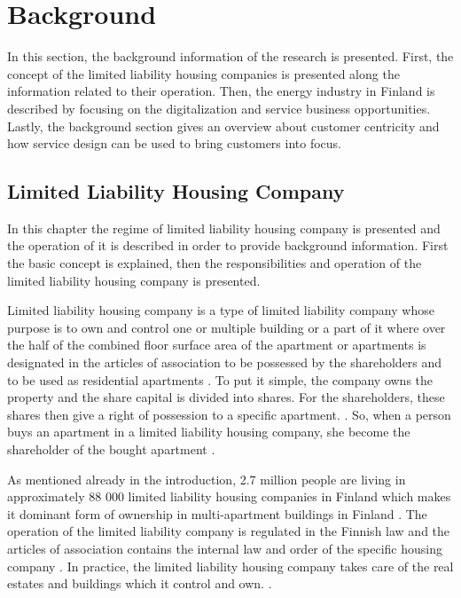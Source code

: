 \chapter{Background}
\label{chapter:background} 

In this section, the background information of the research is presented. First, the concept of the limited liability housing companies is presented along the information related to their operation. Then, the energy industry in Finland is described by focusing on the digitalization and service business opportunities. Lastly, the background section gives an overview about customer centricity and how service design can be used to bring customers into focus.

\section{Limited Liability Housing Company}

In this chapter the regime of limited liability housing company is presented and the operation of it is described in order to provide background information. First the basic concept is explained, then the responsibilities and operation of the limited liability housing company is presented.

Limited liability housing company is a type of limited liability company whose purpose is to own and control one or multiple building or a part of it where over the half of the combined floor surface area of the apartment or apartments is designated in the articles of association to be possessed by the shareholders and to be used as residential apartments \parencite{LLHA:2}. To put it simple, the company owns the property and the share capital is divided into shares. For the shareholders, these shares then give a right of possession to a specific apartment. \parencite{Lujanen:2017}. So, when a person buys an apartment in a limited liability housing company, she become the shareholder of the bought apartment \parencite{YIT}.

As mentioned already in the introduction, 2.7 million people are living in approximately 88 000 limited liability housing companies in Finland which makes it dominant form of ownership in multi-apartment buildings in Finland \parencite{REMF, Stats, Lujanen:2017}. The operation of the limited liability company is regulated in the Finnish law and the articles of association contains the internal law and order of the specific housing company \parencite{YIT}. In practice, the limited liability housing company takes care of the real estates and buildings which it control and own. \parencite{LLHA:2}. 


